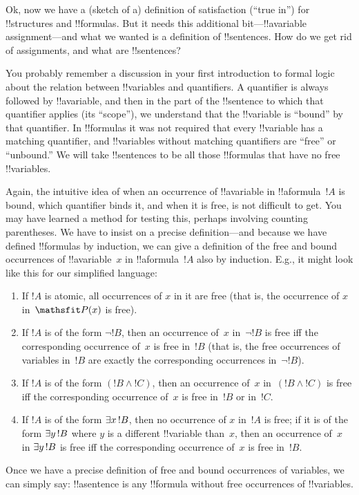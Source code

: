 \documentclass[../../../include/open-logic-section]{subfiles}
\begin{document}


Ok, now we have a (sketch of a) definition of satisfaction (``true
in'') for !!{structure}s and !!{formula}s. But it needs this
additional bit---!!a{variable} assignment---and what we wanted is a
definition of !!{sentence}s. How do we get rid of assignments, and
what are !!{sentence}s?

You probably remember a discussion in your first introduction to
formal logic about the relation between !!{variable}s and quantifiers.
A quantifier is always followed by !!a{variable}, and then in the part
of the !!{sentence} to which that quantifier applies (its ``scope''),
we understand that the !!{variable} is ``bound'' by that quantifier.
In !!{formula}s it was not required that every !!{variable} has a
matching quantifier, and !!{variable}s without matching quantifiers
are ``free'' or ``unbound.''  We will take !!{sentence}s to be all
those !!{formula}s that have no free !!{variable}s.

Again, the intuitive idea of when an occurrence of !!a{variable} in
!!a{formula}~$!A$ is bound, which quantifier binds it, and when it is
free, is not difficult to get. You may have learned a method for
testing this, perhaps involving counting parentheses.  We have to
insist on a precise definition---and because we have defined
!!{formula}s by induction, we can give a definition of the free and
bound occurrences of !!a{variable}~$x$ in !!a{formula}~$!A$ also by
induction.  E.g., it might look like this for our simplified language:
\begin{enumerate}
  \item If $!A$ is atomic, all occurrences of $x$ in it are free (that
  is, the occurrence of $x$ in~$\Atom{\Obj P}{x}$ is free).
  \item If $!A$ is of the form $\lnot !B$, then an occurrence of~$x$
  in~$\lnot !B$ is free iff the corresponding occurrence of~$x$ is
  free in~$!B$ (that is, the free occurrences of variables in~$
  !B$ are exactly the corresponding occurrences in~$\lnot !B$).
  \item If $!A$ is of the form $(!B \land !C)$, then an occurrence of~$x$
  in~$(!B \land !C)$ is free iff the corresponding occurrence of~$x$ is
  free in~$!B$ or in~$!C$.
  \item If $!A$ is of the form $\lexists[x][!B]$, then no occurrence
  of $x$ in~$!A$ is free; if it is of the form $\lexists[y][!B]$ where
  $y$ is a different !!{variable} than~$x$, then an occurrence of~$x$
  in $\lexists[y][!B]$ is free iff the corresponding occurrence of~$x$
  is free in~$!B$.
\end{enumerate}

Once we have a precise definition of free and bound occurrences of
variables, we can simply say: !!a{sentence} is any !!{formula} without
free occurrences of !!{variable}s.
\end{document}
